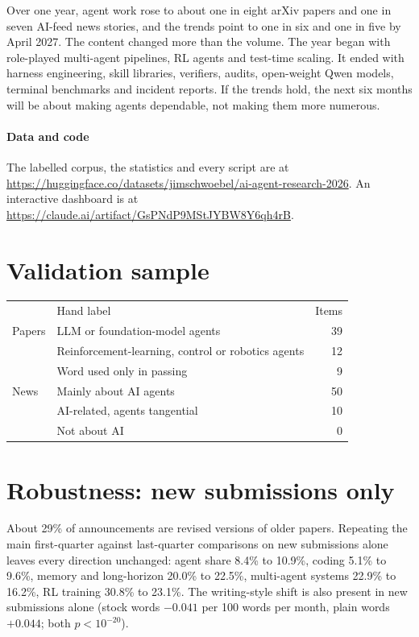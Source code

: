\documentclass[10.5pt]{article}
\newcommand{\throw}{\rowcolor{thead}}
\newcommand{\hd}[1]{{\color{white}\sorasemi\scriptsize #1}}
\begin{document}
Over one year, agent work rose to about one in eight arXiv papers and one in seven AI-feed news stories, and the trends point to one in six and one in five by April 2027. The content changed more than the volume. The year began with role-played multi-agent pipelines, RL agents and test-time scaling. It ended with harness engineering, skill libraries, verifiers, audits, open-weight Qwen models, terminal benchmarks and incident reports. If the trends hold, the next six months will be about making agents dependable, not making them more numerous.

\paragraph{Data and code} The labelled corpus, the statistics and every script are at \url{https://huggingface.co/datasets/jimschwoebel/ai-agent-research-2026}. An interactive dashboard is at \url{https://claude.ai/artifact/GsPNdP9MStJYBW8Y6qh4rB}.

\appendix
\section{Validation sample}\label{app:val}
\begin{table}[!htbp]
  \centering\small
  \begin{tabular}{llr}
    \throw \hd{Sample} & \hd{Hand label} & \hd{Items} \\
    Papers & LLM or foundation-model agents & 39 \\
    \rowcolor{lav} & Reinforcement-learning, control or robotics agents & 12 \\
    & Word used only in passing & 9 \\
    \rowcolor{lav} News & Mainly about AI agents & 50 \\
    & AI-related, agents tangential & 10 \\
    \rowcolor{lav} & Not about AI & 0 \\
    \bottomrule
  \end{tabular}
\end{table}

\section{Robustness: new submissions only}
About 29\% of announcements are revised versions of older papers. Repeating the main first-quarter against last-quarter comparisons on new submissions alone leaves every direction unchanged: agent share 8.4\% to 10.9\%, coding 5.1\% to 9.6\%, memory and long-horizon 20.0\% to 22.5\%, multi-agent systems 22.9\% to 16.2\%, RL training 30.8\% to 23.1\%. The writing-style shift is also present in new submissions alone (stock words $-0.041$ per 100 words per month, plain words $+0.044$; both $p<10^{-20}$).
\end{document}
